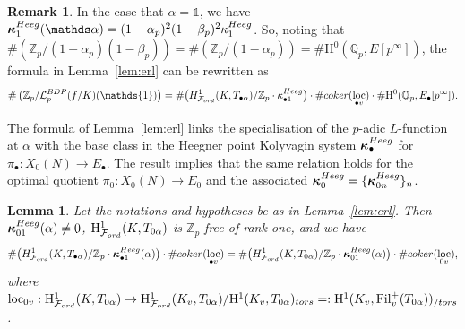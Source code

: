 \documentclass[10pt,reqno]{amsart}
\numberwithin{equation}{section}
\theoremstyle{plain}
\theoremstyle{definition}
\newtheorem{rmk}[thm]{Remark}
\theoremstyle{definition}
\theoremstyle{plain}
\theoremstyle{plain}
\newtheorem{lemma}[thm]{Lemma}
\theoremstyle{plain}
\theoremstyle{plain}
\theoremstyle{plain}
\theoremstyle{plain}
\newcommand{\Fil}{\mathrm{Fil}}
\newcommand{\al}{\alpha} %
\newcommand{\Z}{\mathbb{Z}}
\newcommand{\Q}{\mathbb{Q}}
\newcommand{\Qp}{\mathbb{Q}_{p}}
\newcommand{\Zp}{\mathbb{Z}_{p}}
\newcommand{\bkappa}{\boldsymbol{\kappa}}
\DeclareMathOperator{\loc}{loc}
\newcommand{\Lcal}{\mathcal{L}}
\newcommand{\Fcal}{\mathcal{F}}
\newcommand{\rH}{\mathrm{H}}
\begin{document}
\begin{rmk}\label{rmk:index-HeegnerPt}
In the case that $\alpha = \mathds{1}$, we have ${\bkappa}_{1}^{\rm Heeg}(\mathds\alpha) = (1-\alpha_p)^2(1-\beta_p)^2{\kappa}_1^{\rm Heeg}$. So, noting that
$\#(\Zp/(1-\alpha_p)(1-\beta_p)) = \#(\Zp/(1-\alpha_p)) = \#\rH^0(\Qp,E[p^\infty])$, the formula in Lemma~\ref{lem:erl} can be rewritten
as
\[
\#\left (\Z_p/\Lcal_p^{\rm BDP}(f/K)(\mathds{1}) \right)  =\# \bigl({\rm H}^1_{\Fcal_{\rm ord}}(K,T_{\bullet\al})/\Z_p\cdot\kappa^{\rm Heeg}_{\bullet{1}}\bigr)  \cdot \#{\rm coker}(\loc_{\bullet{v}})
\cdot\#\rH^0(\Q_p,E_\bullet[p^\infty]).
\]
\end{rmk}


The formula of Lemma~\ref{lem:erl} links the specialisation of the $p$-adic $L$-function at $\alpha$ with the base class in the Heegner point Kolyvagin system $\boldsymbol{\kappa}_\bullet^{\rm Heeg}$ for $\pi_\bullet:X_0(N)\rightarrow E_\bullet$. The result implies that the same relation holds for the optimal quotient $\pi_0:X_0(N)\rightarrow E_0$ and the associated $\bkappa_{0}^{\rm Heeg}=\{\bkappa_{0n}^{\rm Heeg}\}_n$.


\begin{lemma}\label{lemma:erlinv} 
Let the notations and hypotheses be as in Lemma~\ref{lem:erl}. Then $\bkappa_{01}^{\rm Heeg}(\alpha)\neq 0$, $\rH^1_{\Fcal_{\rm ord}}(K,T_{0\alpha})$ is $\Z_p$-free of rank one, and we have
\[
\#\bigl({\rm H}^1_{\Fcal_{\rm ord}}(K,T_{\bullet\alpha})/\Z_p\cdot\bkappa^{\rm Heeg}_{\bullet{1}}(\alpha)\bigr)  \cdot \#{\rm coker}(\loc_{\bullet{v}}) =  \# \bigl({\rm H}^1_{\Fcal_{\rm ord}}(K,T_{0\alpha})/\Z_p\cdot\bkappa^{\rm Heeg}_{0 1}(\alpha)\bigr) \cdot \#{\rm coker}(\loc_{0 v}),
\]
where $\loc_{0v}:\rH^1_{\Fcal_{\rm ord}}(K,T_{0\alpha})\to \rH^1_{\Fcal_{\rm ord}}(K_v, T_{0\alpha})/\rH^1(K_v,T_{0\alpha})_{\rm tors}=:\rH^1(K_v,\Fil_v^+(T_{0\alpha}))_{/ \rm tors}$. 

\end{lemma}
\end{document}
